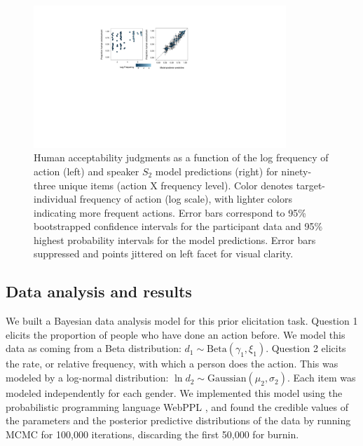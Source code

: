 \documentclass[10pt,letterpaper]{article}
\begin{document}
\begin{figure}[t]
\centering
  \includegraphics[width=0.85\textwidth]{tj-scatters}
  \caption{Human acceptability judgments as a function of the log frequency of action (left) and speaker $S_2$ model predictions (right) for ninety-three unique items (action X frequency level). 
  Color denotes target-individual frequency of action (log scale), with lighter colors indicating more frequent actions. Error bars correspond to 95\% bootstrapped confidence intervals for the participant data and 95\% highest probability intervals for the model predictions. Error bars suppressed and points jittered on left facet for visual clarity.}
  \label{fig:tjScatters}
\end{figure}


\subsection{Data analysis and results}
We built a Bayesian data analysis model for this prior elicitation task.
Question 1 elicits the proportion of people who have done an action before. 
We model this data as coming from a Beta distribution: $d_{1} \sim \text{Beta}(\gamma_{1}, \xi_{1})$. 
Question 2 elicits the rate, or relative frequency, with which a person does the action.
This was modeled by a log-normal distribution: $\ln d_{2} \sim \text{Gaussian}(\mu_{2}, \sigma_{2})$. 
Each item was modeled independently for each gender.
We implemented this model using the probabilistic programming language WebPPL \cite{dippl}, and found the credible values of the parameters and the posterior predictive distributions of the data by running MCMC for 100,000 iterations, discarding the first 50,000 for burnin.
%
\end{document}
